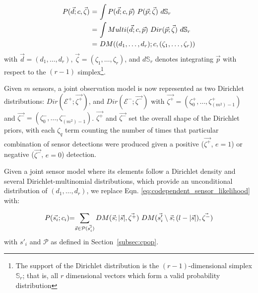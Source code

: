 \begin{equation}
	\label{eq:beta_binomial_revisit}
	\begin{tabular}{r@{ = }l}
        $P(\vec{d} ; c, \vec{\zeta})$ & $\displaystyle\int P(\vec{d} ; c, \vec{p}) ~ P(\vec{p} ; \vec{\zeta}) ~d\mathbb S_r$ \\ [2ex]
        & $\displaystyle\int Multi(\vec{d} ; c, \vec{p}) ~ Dir(\vec{p} ; \vec{\zeta}) ~d\mathbb S_r$ \\ [2ex]
        & $DM((d_1, \ldots, d_r) ; c, (\zeta_1, \ldots, \zeta_r))$
	\end{tabular}
\end{equation}
\noindent with $\vec{d} = (d_1, \ldots, d_r)$, $\vec{\zeta} = (\zeta_1, \ldots, \zeta_r)$, and $d\mathbb S_r$ denotes integrating $\vec{p}$ with respect to the $(r - 1)$ simplex\footnote{The support of the Dirichlet distribution is the $(r - 1)$-dimensional simplex $\mathbb S_r$; that is, all $r$ dimensional vectors which form a valid probability distribution}.

Given $m$ sensors, a joint observation model is now represented as two Dirichlet distributions: $Dir(\mathcal{E^+} ; \vec{\zeta^+})$, and $Dir(\mathcal{E^-} ; \vec{\zeta^-})$ with $\vec{\zeta^+} = (\zeta^+_0, \ldots, \zeta^+_{(m^2)-1})$ and $\vec{\zeta^-} = (\zeta^-_0, \ldots, \zeta^-_{(m^2)-1})$. $\vec{\zeta^+}$ and $\vec{\zeta^-}$ set the overall shape of the Dirichlet priors, with each $\zeta_q$ term counting the number of times that particular combination of sensor detections were produced given a positive ($\vec{\zeta^+}$, $e=1$) or negative ($\vec{\zeta^-}$, $e=0$) detection.


Given a joint sensor model where its elements follow a Dirichlet density and several Dirichlet-multinomial distributions, which provide an unconditional distribution of $(d_1, \ldots, d_r)$, we replace Eqn. \ref{eq:codependent_sensor_likelihood} with:  

\begin{equation}
	\label{eq:joint_dirichlet_multinomial_distribution}
    \begin{tabular}{r@{=}l}
		$P(\vec{s_i} ; c_i)$ & $\displaystyle\sum_{\vec{s} \in \mathcal{P}(\vec{s'_i})} DM(\vec{s} ; |\vec{s}|, \vec{\zeta^+}) ~ DM(\vec{s'_i}\setminus\vec{s} ; (l - |\vec{s}|), \vec{\zeta^-})$
	\end{tabular}
\end{equation}
\noindent with $s'_i$ and $\mathcal{P}$ as defined in Section~\ref{subsec:cpop}.


